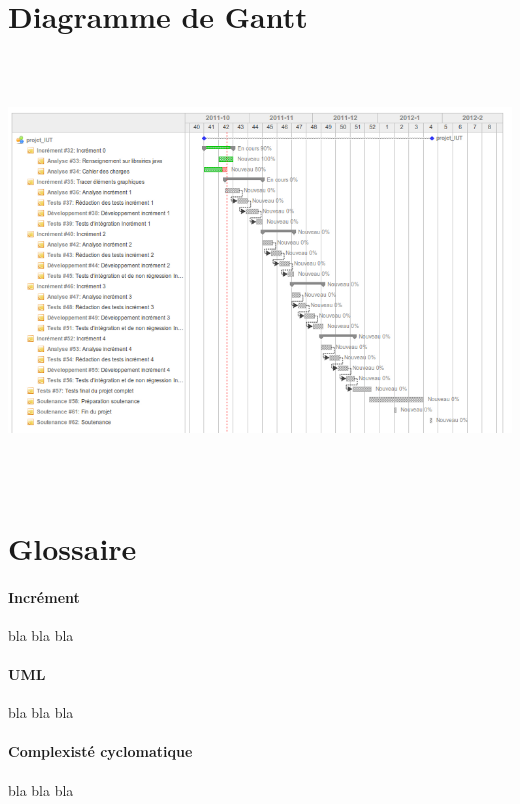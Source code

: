 \documentclass[12pt,a4paper,openany]{article}
\begin{document}
\section{Diagramme de Gantt}
\label{gantt}
\hspace{20px}
\vspace{-330px}
\includegraphics[height=430px, angle=-90]{projetiut-gantt.png}

\section{Glossaire}
	\paragraph{Incrément} bla bla bla
	\paragraph{UML} bla bla bla 
	\paragraph{Complexisté cyclomatique} bla bla bla
%
\end{document}
